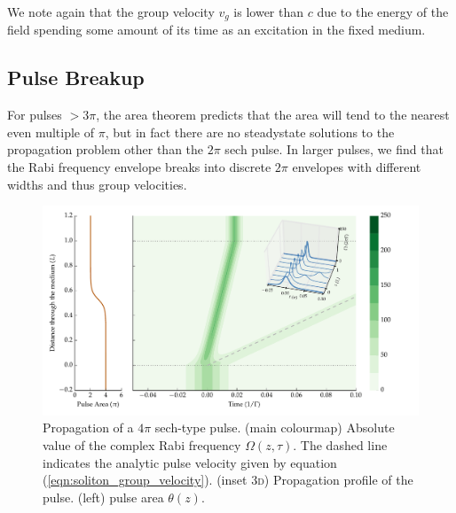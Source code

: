     We note again that the group velocity $v_g$ is lower than $c$ due to the
    energy of the field spending some amount of its time as an excitation in the
    fixed medium.

  \subsection{Pulse Breakup} 

    For pulses $>3 \pi$, the area theorem predicts that the area will tend to
    the nearest even multiple of $\pi$, but in fact there are no steadystate
    solutions to the propagation problem other than the $2\pi$ sech
    pulse\cite{Matulic1972}. In larger pulses, we find that the Rabi frequency
    envelope breaks into discrete $2\pi$ envelopes with different widths and
    thus group velocities\cite{Lamb1971}.

    \begin{figure}[]
      \includegraphics[width=\linewidth]
        {figs/03_nonlinear/coh_sech_4_0pi_fwhm0_020_Ng01000_fig5.pdf}
      \caption{
      Propagation of a $4 \pi$ sech-type pulse. (main colourmap) Absolute value
      of the complex Rabi frequency $\Omega(z, \tau)$. The dashed line indicates
      the analytic pulse velocity given by equation
      (\ref{eqn:soliton_group_velocity}). (inset \textsc{3d}) Propagation
      profile of the pulse. (left) pulse area $\theta(z)$.
      }
      \label{fig:sit_4pi}
    \end{figure}

